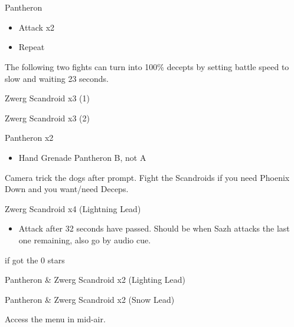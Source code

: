 \chapter[Chapter 2]{}

\begin{multicols}{2}
\begin{battle}{Pantheron}
\begin{itemize}
    \item Attack x2
    \item Repeat
\end{itemize}
\end{battle}

The following two fights can turn into 100\% decepts by setting battle speed to slow and waiting 23 seconds.
\begin{battle}{Zwerg Scandroid x3 (1)}
\end{battle}

\begin{battle}{Zwerg Scandroid x3 (2)}
\end{battle}

\begin{battle}{Pantheron x2}
\begin{itemize}
    \item Hand Grenade Pantheron B, not A
\end{itemize}
\end{battle}

Camera trick the dogs after prompt. Fight the Scandroids if you need Phoenix Down and you want/need Deceps.

\begin{battle}{Zwerg Scandroid x4 (Lightning Lead)}
\begin{itemize}
    \item Attack after 32 seconds have passed. Should be when Sazh attacks the last one remaining, also go by audio cue.
\end{itemize}
 if got the 0 stars
\end{battle}


\begin{battle}{Pantheron \& Zwerg Scandroid x2 (Lighting Lead)}
\end{battle}


\begin{battle}{Pantheron \& Zwerg Scandroid x2 (Snow Lead)}
\end{battle}
Access the menu in mid-air.


\end{multicols}
